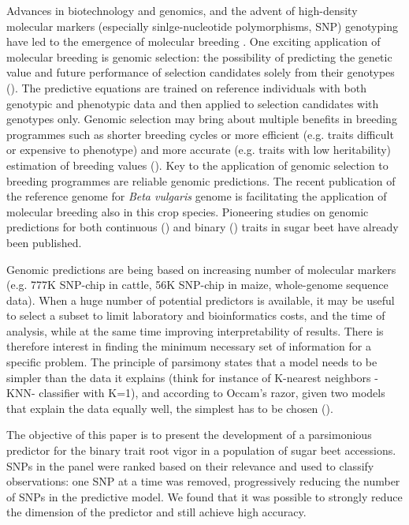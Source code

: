 Advances in biotechnology and genomics, and the advent of high-density
molecular markers (especially sinlge-nucleotide polymorphisms, SNP)
genotyping have led to the emergence of molecular breeding
\cite{moose2008molecular}.
One exciting application of molecular breeding is genomic selection: the possibility of predicting the genetic value and future
performance of selection candidates solely from their genotypes (\cite{meuwissen2001prediction}). The predictive equations are
trained on reference individuals with both genotypic and phenotypic data and then
applied to selection candidates with genotypes only. Genomic selection
may bring about multiple benefits in breeding programmes such as
shorter breeding cycles or more efficient (e.g. traits difficult or
expensive to phenotype) and more accurate (e.g. traits with low
heritability) estimation of breeding values
(\cite{goddard2007genomic,heffner2010plant}). Key to the application of
genomic selection to breeding programmes are reliable genomic
predictions.
The recent publication of the reference genome for \emph{Beta
vulgaris} genome \cite{dohm2013genome} is facilitating the application
of molecular breeding also in this crop species. Pioneering studies on
genomic predictions for both continuous (\cite{hofheinz2012genome,wurschum2013genomic}) and binary
(\cite{biscarini2014genome}) traits in sugar beet have already been published.

Genomic predictions are being based on increasing number of molecular
markers (e.g. 777K SNP-chip in cattle, 56K SNP-chip in maize,
whole-genome sequence data). When a huge number of potential predictors
is available, it may be useful to select a subset to limit laboratory
and bioinformatics costs, and the time of analysis, while at the same
time improving interpretability of results. There is therefore interest
in finding the minimum necessary set of information for a specific
problem. The principle of parsimony states that
a model needs to be simpler than the data it explains (think for
instance of K-nearest neighbors -KNN- classifier with K=1), and according to Occam's razor, given two models that explain the data
equally well, the simplest has to be chosen (\cite{chaitin2006limits}).

The objective of this paper is to present the development of a
parsimonious predictor for the binary trait root vigor in a population
of sugar beet accessions.
SNPs in the panel were ranked based on their relevance and used to classify observations: one SNP at a
time was removed, progressively reducing the number of SNPs in the
predictive model.
We found that it was possible to strongly reduce the dimension of the
predictor and still achieve high accuracy.


